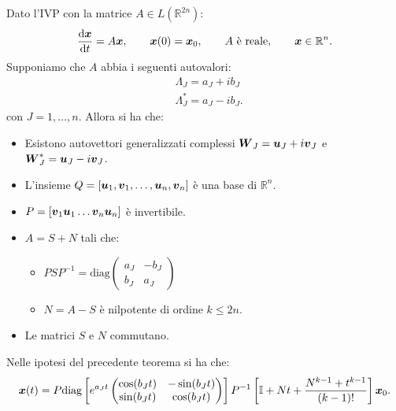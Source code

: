 \begin{thm}
    Dato l'IVP con la matrice $A \in L(\mathbb{R}^{2n})$:
    \[
	\frac{\text{d} \boldsymbol{x}}{\text{d} t} = A\boldsymbol{x}, \qquad \boldsymbol{x}(0) = \boldsymbol{x}_0, \qquad A \text{ è reale}, \qquad \boldsymbol{x} \in \mathbb{R}^n
    .\] 
    Supponiamo che $A$ abbia i seguenti autovalori:
    \[\begin{aligned}
	&\Lambda_J = a_J + ib_J\\
	&\Lambda^*_J = a_J-ib_J
    .\end{aligned}\]
    con $J = 1, \ldots, n$. Allora si ha che:
    \begin{itemize}
        \item Esistono autovettori generalizzati complessi $\boldsymbol{W}_J = \boldsymbol{u}_J + i\boldsymbol{v}_J$ e $\boldsymbol{W}^*_J = \boldsymbol{u}_J-i\boldsymbol{v}_J$.
	\item L'insieme $Q = \left[\boldsymbol{u}_1, \boldsymbol{v}_1, \ldots, \boldsymbol{u}_n, \boldsymbol{v}_n \right]$ è una base di $\mathbb{R}^n$.
	\item $P = \left[\boldsymbol{v}_1\boldsymbol{u}_1\ldots\boldsymbol{v}_n\boldsymbol{u}_n\right]$ è invertibile.
	\item $A = S + N$ tali che:
	    \begin{itemize}
	        \item $PSP^{-1} = \text{diag}
		    \begin{pmatrix} 
			a_J & -b_J\\
			b_J & a_J
		    \end{pmatrix} $ 
		\item $N = A-S$ è nilpotente di ordine $k \le 2n$.
	    \end{itemize}
	\item Le matrici $S$ e $N$ commutano.
    \end{itemize}
\end{thm}
\noindent
\begin{thm}
    Nelle ipotesi del precedente teorema si ha che:
    \[
	\boldsymbol{x}(t) = 
	P\text{diag}\left[e^{a_Jt}\begin{pmatrix} \cos (b_Jt) & -\sin (b_Jt) \\ \sin (b_Jt) & \cos (b_Jt)  \end{pmatrix}\right]
	    P^{-1}\left[\mathbb{I} + N t + \frac{N^{k-1} + t^{k-1}}{(k-1)!}\right]\boldsymbol{x}_0	
    .\] 
\end{thm}
\noindent
